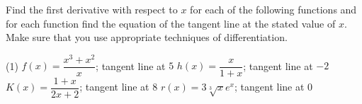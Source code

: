 \documentclass[10pt,oneside,]{book}
\theoremstyle{plain}
\theoremstyle{definition}
\numberwithin{equation}{section}
\newcommand{\fe}[2]{#1\mathopen{}\left(#2\right)\mathclose{}}
\begin{document}
\par\smallskip\noindent
\hypertarget{exercisegroup-88}{\null}Find the first derivative with respect to \(x\) for each of the following functions and for each function find the equation of the tangent line at the stated value of \(x\).  Make sure that you use appropriate techniques of differentiation.%
\par
\begin{exercisegroup}(1)
\exercise[21.]\hypertarget{exercise-421}{\null}\(\fe{f}{x}=\dfrac{x^3+x^2}{x}\); tangent line at \(5\)%
\exercise[22.]\hypertarget{exercise-422}{\null}\(\fe{h}{x}=\dfrac{x}{1+x}\); tangent line at \(-2\)%
\exercise[23.]\hypertarget{exercise-423}{\null}\(\fe{K}{x}=\dfrac{1+x}{2x+2}\); tangent line at \(8\)%
\exercise[24.]\hypertarget{exercise-424}{\null}\(\fe{r}{x}=3\sqrt[3]{x}e^x\); tangent line at \(0\)%
\end{exercisegroup}
\par\smallskip\noindent
\end{document}
